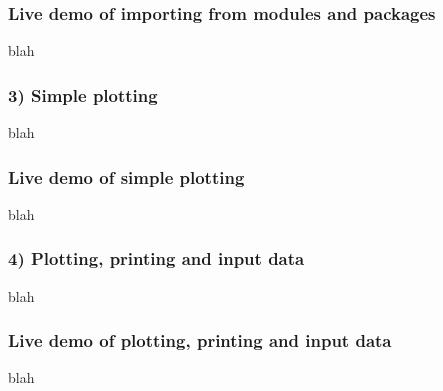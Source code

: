 \documentclass[14pt]{beamer}
\begin{document}

\begin{frame}[fragile]
\frametitle{Live demo of importing from modules and packages}
blah
\end{frame}


\begin{frame}[fragile]
\frametitle{3) Simple plotting}
blah
\end{frame}


\begin{frame}[fragile]
\frametitle{Live demo of simple plotting}
blah
\end{frame}


\begin{frame}[fragile]
\frametitle{4) Plotting, printing and input data}
blah
\end{frame}


\begin{frame}[fragile]
\frametitle{Live demo of plotting, printing and input data}
blah
\end{frame}
\end{document}
